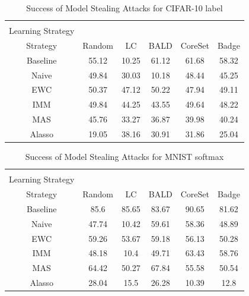 \begin{table}[h]
    \centering
    \begin{tabular}{c | c c c c c} 
        \hline
        \diagbox[width=11em]{Active \\ Learning Strategy}{Continual Learning \\ Strategy} & Random & LC & BALD & CoreSet & Badge \\ 
        \hline 
        Baseline & 55.12 & 10.25 & 61.12 & 61.68 & 58.32\\
        Naive & 49.84 & 30.03 & 10.18 & 48.44 & 45.25 \\
        EWC & 50.37 & 47.12 & 50.22 & 47.94 & 49.11 \\
        IMM & 49.84 & 44.25 & 43.55 & 49.64 & 48.22 \\
        MAS & 45.76 & 33.27 & 36.87 & 39.98 & 40.24 \\
        Alasso & 19.05 & 38.16 & 30.91 & 31.86 & 25.04 \\
        \hline
    \end{tabular}
    \caption{Success of Model Stealing Attacks for CIFAR-10 label}
    \label{fig:ModelStealingCIFAR10Label}
\end{table}


\begin{table}[h]
    \centering
    \begin{tabular}{c | c c c c c} 
        \hline
        \diagbox[width=11em]{Active \\ Learning Strategy}{Continual Learning \\ Strategy} & Random & LC & BALD & CoreSet & Badge \\ 
        \hline 
        Baseline & 85.6 & 85.65 & 83.67 & 90.65 & 81.62\\
        Naive & 47.74 & 10.42 & 59.61 & 58.36 & 48.89 \\
        EWC &  59.26 & 53.67 & 59.18 & 56.13 & 50.28\\
        IMM & 48.18 & 10.4 & 49.71 & 63.43 & 58.76  \\
        MAS &  64.42 & 50.27 & 67.84 & 55.58 & 50.54\\
        Alasso & 28.04 & 15.5 & 26.28 & 10.39 & 12.8 \\
        \hline
    \end{tabular}
    \caption{Success of Model Stealing Attacks for MNIST softmax}
    \label{fig:ModelStealingMNISTSoftmax}
\end{table}

